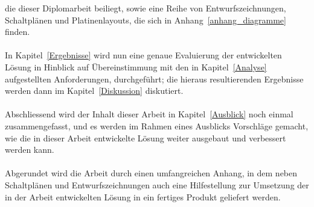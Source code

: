 die dieser Diplomarbeit beiliegt, sowie eine Reihe von Entwurfszeichnungen, Schaltplänen
und Platinenlayouts, die sich in Anhang~\ref{anhang_diagramme} finden.\\
\\
In Kapitel~\ref{Ergebnisse} wird nun eine genaue Evaluierung der entwickelten Lösung 
in Hinblick auf Übereinstimmung mit den in Kapitel~\ref{Analyse} aufgestellten Anforderungen, 
durchgeführt; die hieraus resultierenden Ergebnisse werden dann im Kapitel~\ref{Diskussion}
diskutiert.\\
\\
Abschliessend wird der Inhalt dieser Arbeit in Kapitel~\ref{Ausblick} noch einmal zusammengefasst,
und es werden im Rahmen eines Ausblicks Vorschläge gemacht, wie die in dieser Arbeit entwickelte
Lösung weiter ausgebaut und verbessert werden kann.\\
\\
Abgerundet wird die Arbeit durch einen umfangreichen Anhang, in dem neben Schaltplänen und 
Entwurfszeichnungen auch eine Hilfestellung zur Umsetzung der in der Arbeit entwickelten
Lösung in ein fertiges Produkt geliefert werden.
